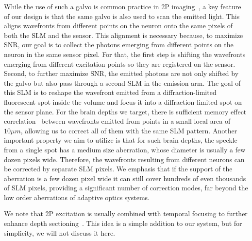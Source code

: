 While the use of such a galvo is common practice in 2P imaging~\cite{}, 
a key feature of our design is that the same galvo is also used to scan the emitted light. This aligns wavefronts from different points on the neuron onto the same pixels of both the SLM and the sensor.
This alignment is necessary because, to maximize SNR, our goal is to collect the photons emerging from different points on the neuron in the same sensor pixel. For that, the first step is shifting the wavefronts emerging from different excitation points so they are registered on the sensor.
Second, to further maximize SNR, the emitted photons are not only shifted by the galvo but also pass through a second SLM in the emission arm. The goal of this SLM is to reshape the wavefront emitted from a diffraction-limited fluorescent spot inside the volume and focus it into a diffraction-limited spot on the sensor plane. For the brain depths we target, there is sufficient memory effect correlation~\cite{osnabrugge2017generalized,SeeThroughSubmission} between wavefronts emitted from points in a small local area of $10\mu m$, allowing us to correct all of them with the same SLM pattern. Another important property we aim to utilize is that for such brain depths, the speckle from a single spot has a medium size aberration, whose diameter is usually a few dozen pixels wide. Therefore, the wavefronts resulting from different neurons can be corrected by separate SLM pixels.
We emphasis that if the support of the aberration is a few dozen pixel wide it can still cover hundreds of even thousands of SLM pixels, providing a significant number of correction modes, far beyond the low order aberrations of adaptive optics systems. 

We note that 2P excitation is usually combined with temporal focusing to further enhance depth sectioning~\cite{hernandez2016three,sun2018four,pegard2017three,mardinly2018precise,sridharan2021high}. This idea is a simple addition to our system, but for simplicity, we will not discuss it here.



